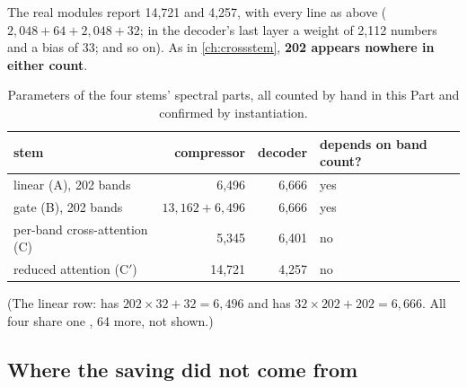 The real modules report 14,721 and 4,257, with every line as above ( $2{,}048 + 64 + 2{,}048 + 32$; in the decoder's last layer a weight of 2,112 numbers and a bias of 33; and so on)\tagC. As in \cref{ch:crossstem}, \textbf{202 appears nowhere in either count}.

\begin{table}[htbp]\centering
\caption{Parameters of the four stems' spectral parts, all counted by hand in this Part and confirmed by instantiation.}\label{tab:specdecoder:stemparams}
\begin{tabular}{lrrl}\toprule
stem & compressor & decoder & depends on band count?\\\midrule
linear (A), 202 bands & 6,496 & 6,666 & yes\\
gate (B), 202 bands & $13{,}162 + 6{,}496$ & 6,666 & yes\\
per-band cross-attention (C) & 5,345 & 6,401 & no\\
reduced attention (C$'$) & 14,721 & 4,257 & no\\\bottomrule
\end{tabular}
\end{table}
(The linear row:  has $202\times32 + 32 = 6{,}496$ and  has $32\times202 + 202 = 6{,}666$. All four share one , 64 more, not shown.)

\subsection{Where the saving did not come from}

